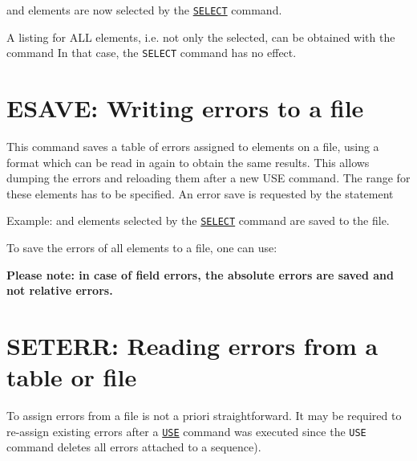 and elements are now selected by the
\hyperref[sec:select]{\tt SELECT} command.  

A listing for ALL elements, i.e. not only the selected, can be obtained
with the command  
In that case, the {\tt SELECT} command has no effect.


%

\section{ESAVE: Writing errors to a file}
\label{sec:esave}


This command saves a table of errors assigned to elements on a file,
using a format which can be read in again to obtain the same
results. This allows dumping the errors and reloading them after a new
USE command. The range for these elements has to be specified. An error
save is requested by the statement  

Example: 
and elements selected by the  \hyperref[sec:seclect]{\tt SELECT}
command are saved to the file.  


To save the errors of all elements to a file, one can use: 

{\bf Please note: in case of field errors, the absolute errors are
  saved and not relative errors. } 

\section{SETERR: Reading errors from a table or file}
\label{Sec:seterr}

To assign errors from a file is not a priori straightforward. It may be
required to re-assign existing errors after a \hyperref[sec:use]{\tt USE}
command was executed since the {\tt USE} command deletes all errors attached to 
a sequence).

